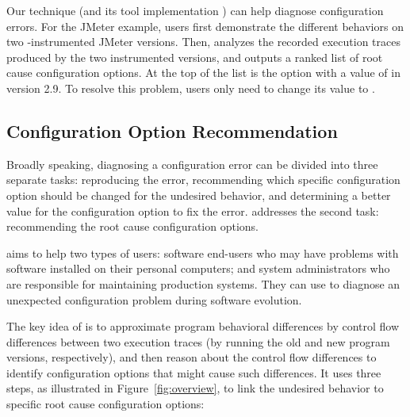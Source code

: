 
Our technique (and its tool implementation \ourtool) can help
diagnose configuration errors. For the JMeter example,
users first demonstrate the different
behaviors on two \ourtool-instrumented
JMeter versions. Then, \ourtool analyzes the
recorded execution traces produced by the two instrumented
versions, and outputs a ranked list of root cause configuration options.
At the top of the list is the
 option with a value of 
in version 2.9.
To resolve this problem, users only need to change
its value to .

\subsection{Configuration Option Recommendation}

Broadly speaking, diagnosing a configuration
error can be divided into three separate tasks:
reproducing the error, recommending which specific
configuration option should be changed for the undesired
behavior, and determining a better value for the
configuration option to fix the error. \ourtool addresses
the second task: recommending the root cause configuration options.

\ourtool aims to help two types of users: software end-users
who may have problems with software installed on their
personal computers; and system administrators who are
responsible for maintaining production systems.
They can use \ourtool to diagnose an unexpected configuration
problem during software evolution. 


The key idea of \ourtool is to approximate program behavioral
differences by control flow differences between 
two execution traces (by running the old
and new program versions, respectively),
and then reason about the control flow differences to
identify configuration options that
might cause such differences. It uses
three steps, as illustrated in Figure~\ref{fig:overview},  to link the undesired
behavior to specific root cause configuration options:

